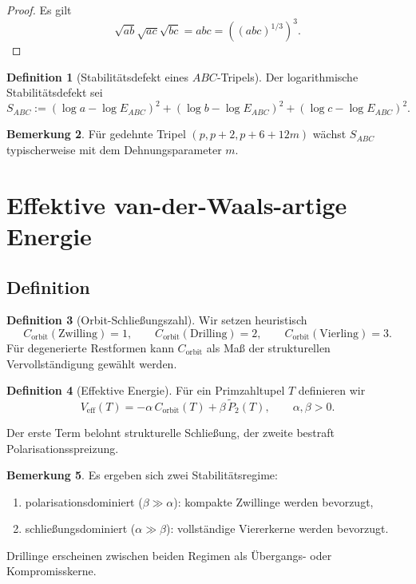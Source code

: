 \documentclass[11pt,a4paper]{article}
\theoremstyle{definition}
\newtheorem{definition}{Definition}[section]
\newtheorem{remark}[definition]{Bemerkung}
\theoremstyle{plain}
\begin{document}
	\begin{proof}
		Es gilt
		\[
		\sqrt{ab}\sqrt{ac}\sqrt{bc}=abc=((abc)^{1/3})^3.
		\]
	\end{proof}
	
	\begin{definition}[Stabilitätsdefekt eines $ABC$-Tripels]
		Der logarithmische Stabilitätsdefekt sei
		\[
		S_{ABC}:=(\log a-\log E_{ABC})^2+(\log b-\log E_{ABC})^2+(\log c-\log E_{ABC})^2.
		\]
	\end{definition}
	
	\begin{remark}
		Für gedehnte Tripel $(p,p+2,p+6+12m)$ wächst $S_{ABC}$ typischerweise mit dem Dehnungsparameter $m$.
	\end{remark}
	
	\section{Effektive van-der-Waals-artige Energie}
	
	\subsection{Definition}
	
	\begin{definition}[Orbit-Schließungszahl]
		Wir setzen heuristisch
		\[
		C_{\mathrm{orbit}}(\text{Zwilling})=1,\qquad
		C_{\mathrm{orbit}}(\text{Drilling})=2,\qquad
		C_{\mathrm{orbit}}(\text{Vierling})=3.
		\]
		Für degenerierte Restformen kann $C_{\mathrm{orbit}}$ als Maß der strukturellen Vervollständigung gewählt werden.
	\end{definition}
	
	\begin{definition}[Effektive Energie]
		Für ein Primzahltupel $T$ definieren wir
		\[
		V_{\mathrm{eff}}(T)= -\alpha\,C_{\mathrm{orbit}}(T)+\beta\,\widetilde P_2(T),\qquad \alpha,\beta>0.
		\]
	\end{definition}
	
	Der erste Term belohnt strukturelle Schließung, der zweite bestraft Polarisationsspreizung.
	
	\begin{remark}
		Es ergeben sich zwei Stabilitätsregime:
		\begin{enumerate}[label=(\arabic*)]
			\item polarisationsdominiert ($\beta\gg\alpha$): kompakte Zwillinge werden bevorzugt,
			\item schließungsdominiert ($\alpha\gg\beta$): vollständige Viererkerne werden bevorzugt.
		\end{enumerate}
		Drillinge erscheinen zwischen beiden Regimen als Übergangs- oder Kompromisskerne.
	\end{remark}
	
\end{document}
